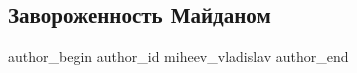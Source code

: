  
 
 
 
 
 
\subsection{Завороженность Майданом}
\label{sec:22_11_2021.fb.miheev_vladislav.1.zavorozhennost_maidan}
 
\ifcmt
 author_begin
   author_id miheev_vladislav
 author_end
\fi
